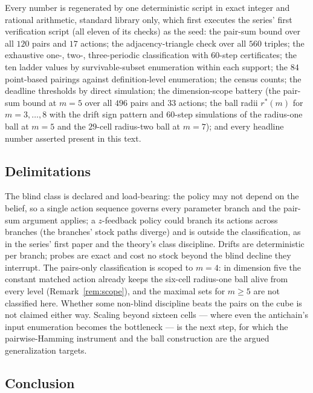 \documentclass[10pt,twocolumn]{article}
\theoremstyle{plain}
\theoremstyle{definition}
\theoremstyle{remark}
\begin{document}
Every number is regenerated by one deterministic script in exact
integer and rational arithmetic, standard library only, which first executes the series' first verification script (all eleven of its checks) as the seed: the
pair-sum bound over all \(120\) pairs and \(17\) actions; the
adjacency-triangle check over all \(560\) triples; the exhaustive
one-, two-, three-periodic classification with \(60\)-step
certificates; the ten ladder values by survivable-subset enumeration
within each support; the \(84\) point-based pairings against
definition-level enumeration; the census counts; the deadline
thresholds by direct simulation; the dimension-scope battery (the
pair-sum bound at \(m = 5\) over all \(496\) pairs and \(33\)
actions; the ball radii \(r^{*}(m)\) for \(m = 3, \dots, 8\) with
the drift sign pattern and \(60\)-step simulations of the radius-one
ball at \(m = 5\) and the \(29\)-cell radius-two ball at
\(m = 7\)); and every headline number asserted present in this
text.

\subsection{Delimitations}\label{scope}

The blind class is declared and load-bearing: the policy may not
depend on the belief, so a single action sequence governs every
parameter branch and the pair-sum argument applies; a
\(z\)-feedback policy could branch its actions across branches (the
branches' stock paths diverge) and is outside the classification, as in the series' first paper and the theory's class discipline. Drifts are
deterministic per branch; probes are exact and cost no stock beyond
the blind decline they interrupt. The pairs-only classification is scoped to
\(m = 4\): in dimension five the constant matched action already
keeps the six-cell radius-one ball alive from every level
(Remark~\ref{rem:scope}), and the maximal sets for \(m \ge 5\) are
not classified here. Whether some non-blind discipline
beats the pairs on the cube is not claimed either way. Scaling beyond
sixteen cells --- where even the antichain's input enumeration becomes
the bottleneck --- is the next step, for which the pairwise-Hamming
instrument and the ball construction are the argued generalization
targets.

\subsection{Conclusion}\label{conclusion}
\end{document}
